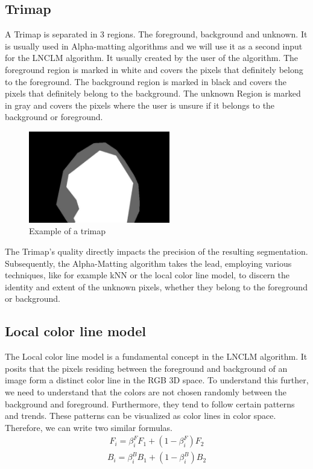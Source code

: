 \subsection{Trimap}
A Trimap is separated in 3 regions. The foreground, background and unknown. It is usually used in Alpha-matting algorithms and we will use it as a second input for the LNCLM algorithm. It usually created by the user of the algorithm.
The foreground region is marked in white and covers the pixels that definitely belong to the foreground.
The background region is marked in black and covers the pixels that definitely belong to the background.
The unknown Region is marked in gray and covers the pixels where the user is unsure if it belongs to the background or foreground.

\begin{figure}[htb]
	\begin{center}
		\includegraphics[width=175pt]{bilder/trimap}
		\caption{Example of a trimap}\label{fig_trimap}
	\end{center}
\end{figure}

The Trimap's quality directly impacts the precision of the resulting segmentation. Subsequently, the Alpha-Matting algorithm takes the lead, employing various techniques, like for example kNN or the local color line model, to discern the identity and extent of the unknown pixels, whether they belong to the foreground or background. 

\subsection{Local color line model}
\label{sec:localcolor}
The Local color line model is a fundamental concept in the LNCLM algorithm. It posits that the pixels residing between the foreground and background of an image form a distinct color line in the RGB 3D space.
To understand this further, we need to understand that the colors are not chosen randomly between the background and foreground. Furthermore, they tend to follow certain patterns and trends. These patterns can be visualized as color lines in color space. 
Therefore, we can write two similar formulas.
\begin{align}\label{eq_f}
	F_{i} = \beta_{i}^{F}F_{1} + (1 - \beta_{i}^{F})F_{2}   
\end{align}
\begin{align}\label{eq_b}
	B_{i} = \beta_{i}^{B}B_{1} + (1 - \beta_{i}^{B})B_{2}   
\end{align}

